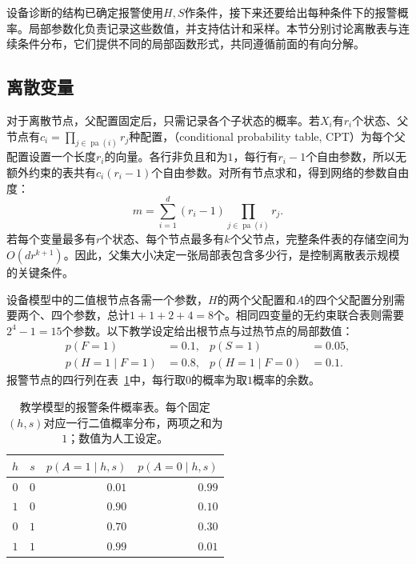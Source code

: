 设备诊断的结构已确定报警使用$H,S$作条件，接下来还要给出每种条件下的报警概率。局部参数化负责记录这些数值，并支持估计和采样。本节分别讨论离散表与连续条件分布，它们提供不同的局部函数形式，共同遵循前面的有向分解。

\subsection{离散变量}
\label{sec:pgm-directed-discrete}

对于离散节点，父配置固定后，只需记录各个子状态的概率。若$X_i$有$r_i$个状态、父节点有$c_i=\prod_{j\in\operatorname{pa}(i)}r_j$种配置，（conditional probability table, CPT）为每个父配置设置一个长度$r_i$的向量。各行非负且和为$1$，每行有$r_i-1$个自由参数，所以无额外约束的表共有$c_i(r_i-1)$个自由参数。对所有节点求和，得到网络的参数自由度：
\begin{equation}
  m=\sum_{i=1}^{d}(r_i-1)
       \prod_{j\in\operatorname{pa}(i)}r_j.
  \label{eq:pgm-directed-cpt-size}
\end{equation}
若每个变量最多有$r$个状态、每个节点最多有$k$个父节点，完整条件表的存储空间为$O(dr^{k+1})$。因此，父集大小决定一张局部表包含多少行，是控制离散表示规模的关键条件。

设备模型中的二值根节点各需一个参数，$H$的两个父配置和$A$的四个父配置分别需要两个、四个参数，总计$1+1+2+4=8$个。相同四变量的无约束联合表则需要$2^4-1=15$个参数。以下教学设定给出根节点与过热节点的局部数值：
\[
  \begin{aligned}
    p(F=1)&=0.1,& p(S=1)&=0.05,\\
    p(H=1\mid F=1)&=0.8,&
    p(H=1\mid F=0)&=0.1.
  \end{aligned}
\]
报警节点的四行列在表~\ref{tab:pgm-directed-alarm-cpt}中，每行取$0$的概率为取$1$概率的余数。

\begin{table}[htbp]
  \centering
  \begin{tabular}{@{}ccrr@{}}
    \toprule
    $h$ & $s$ & $p(A=1\mid h,s)$ & $p(A=0\mid h,s)$ \\
    \midrule
    $0$ & $0$ & $0.01$ & $0.99$ \\
    $1$ & $0$ & $0.90$ & $0.10$ \\
    $0$ & $1$ & $0.70$ & $0.30$ \\
    $1$ & $1$ & $0.99$ & $0.01$ \\
    \bottomrule
  \end{tabular}
  \caption{教学模型的报警条件概率表。每个固定$(h,s)$对应一行二值概率分布，两项之和为$1$；数值为人工设定。}
  \label{tab:pgm-directed-alarm-cpt}
\end{table}

